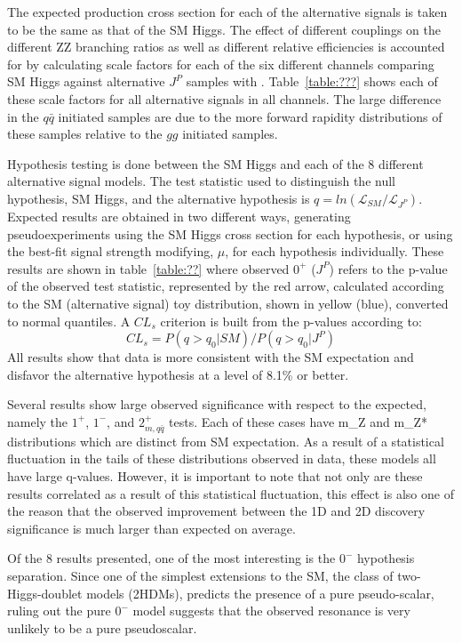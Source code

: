 The expected production cross section for each of the alternative 
signals is taken to be the same as that of the SM Higgs.  The 
effect of different couplings on the different ZZ branching 
ratios as well as different relative efficiencies is accounted
for by calculating scale factors for each of the six different 
channels comparing SM Higgs against alternative $J^P$ samples 
with \JHUGen.  Table~\ref{table:???} shows each of these scale
factors for all alternative signals in all channels.  The large
difference in the $q\bar{q}$ initiated samples are due to the
more forward rapidity distributions of these samples relative to 
the $gg$ initiated samples.  

Hypothesis testing is done between the SM Higgs and each of the 
8 different alternative signal models.  The test statistic used
to distinguish the null hypothesis, SM Higgs, and the alternative 
hypothesis is $q=ln(\mathscr{L}_{SM}/\mathscr{L}_{J^P})$. 
Expected results are
obtained in two different ways, generating pseudoexperiments using
the SM Higgs cross section for each hypothesis, 
or using the best-fit signal strength modifying, $\mu$, for each
hypothesis individually.  These results are shown in 
table~\ref{table:??} where observed $0^+$ ($J^P$) refers to the 
p-value 
of the observed test statistic, represented by the red arrow,
calculated according to the SM (alternative signal) toy 
distribution, shown in yellow (blue), converted to normal 
quantiles.  A $CL_s$ criterion is built from the p-values 
according to:
\begin{equation}
CL_s = P(q>q_0|SM)/P(q>q_0|J^P)
\end{equation}  
All results show that data is more consistent with 
the SM expectation and disfavor the alternative hypothesis
at a level of 8.1\% or better.  

Several results show large observed significance with respect to 
the expected, namely the $1^+$, $1^-$, and $2_{m,q\bar{q}}^+$ tests.
Each of these cases have m_{Z} and m_{Z*} distributions which are
distinct from SM expectation.  As a result of a statistical
fluctuation in the tails of these distributions observed in data,
these models all have large q-values.  However, it is important
to note that not only are these results correlated as a result
of this statistical fluctuation, this effect is also one of the 
reason that the observed improvement between the 1D and 2D 
discovery significance is much larger than expected on average.

Of the 8 results presented, one of the most interesting is the 
$0^-$ hypothesis separation.  Since one of the simplest extensions
to the SM, the class of two-Higgs-doublet models (2HDMs), 
predicts the presence of a pure pseudo-scalar, ruling out the 
pure $0^-$ model suggests that the observed resonance is very 
unlikely to be a pure pseudoscalar. 

